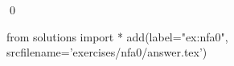 
\begin{ex} 
  \label{ex:nfa0}
  
  \qed
\end{ex} 
\begin{python0}
from solutions import *
add(label="ex:nfa0",
    srcfilename='exercises/nfa0/answer.tex') 
\end{python0}
